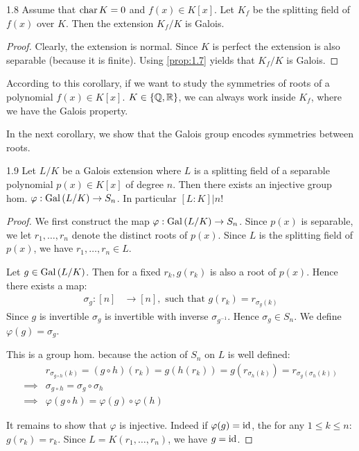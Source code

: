 \documentclass[twoside = false,	%
		headsepline,		%
		parskip = true,
		]{scrbook}						%
\begin{document}
        \begin{corollary}{}{1.8}
            Assume that $\mathrm{char} \, K = 0$ and $f(x) \in K[x]$. Let $K_f$ be the splitting field of $f(x)$ over $K$. Then the extension $K_f/K$ is Galois.
        \end{corollary}
        \begin{proof}
            Clearly, the extension is normal. Since $K$ is perfect the extension is also separable (because it is finite). Using \ref{prop:1.7} yields that $K_f/K$ is Galois.
        \end{proof}
        
        According to this corollary, if we want to study the symmetries of roots of a polynomial $f(x) \in K[x]$. $K \in \{\mathbb Q,\mathbb R\}$, we can always work inside $K_f$, where we have the Galois property.
        
        In the next corollary, we show that the Galois group encodes symmetries between roots.
        
        \begin{corollary}{}{1.9}
            Let $L/K$ be a Galois extension where $L$ is a splitting field of a separable polynomial $p(x) \in K[x]$ of degree $n$. Then there exists an injective group hom. $\varphi: \mathrm{Gal}\left( L/K\right) \rightarrow S_n$. In particular $[L:K]|n!$
        \end{corollary}
        
        \begin{proof}
            We first construct the map $\varphi: \mathrm{Gal}\left( L/K\right) \rightarrow S_n$. Since $p(x)$ is separable, we let $r_1,\dots,r_n$ denote the distinct roots of $p(x)$. Since $L$ is the splitting field of $p(x)$, we have $r_1,\dots,r_n \in L$.
            
            Let $g \in \mathrm{Gal}\left( L/K\right)$. Then for a fixed $r_k, g(r_k)$ is also a root of $p(x)$. Hence there exists a map:
            \begin{align*}
                \sigma_g: [n] &\rightarrow [n], \text{ such that } g(r_k) = r_{\sigma_g(k)}
            \end{align*}
            Since $g$ is invertible $\sigma_g$ is invertible with inverse $\sigma_{g^{-1}}$. Hence $\sigma_g \in S_n$. We define $\varphi(g) = \sigma_g$.
            
            This is a group hom. because the action of $S_n$ on $L$ is well defined:
            \begin{align*}
                &r_{\sigma_{g \circ h}(k)} = (g \circ h)(r_k) = g(h(r_k)) = g(r_{\sigma_h(k)}) = r_{\sigma_g(\sigma_h(k))} \\
                \implies &\sigma_{g \circ h} = \sigma_g \circ \sigma_h \\
                \implies &\varphi(g \circ h) = \varphi(g) \circ \varphi(h)
            \end{align*}
            
            It remains to show that $\varphi$ is injective. Indeed if $\varphi(g) =\mathrm{id}$, the for any $1 \leq k \leq n$: $g(r_k) = r_k$. Since $L = K(r_1, \dots, r_n)$, we have $g = \mathrm{id}$.
        \end{proof}
        
\end{document}
